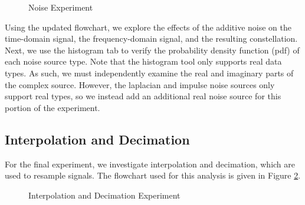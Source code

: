 \documentclass{article}
\begin{document}
\begin{figure}[H]
	\centerline{}
	\caption{Noise Experiment}
	\label{fig::noise_experiment}
\end{figure}

Using the updated flowchart, we explore the effects of the additive noise on the time-domain signal, the frequency-domain signal, and the resulting constellation. Next, we use the histogram tab to verify the probability density function (pdf) of each noise source type. Note that the histogram tool only supports real data types. As such, we must independently examine the real and imaginary parts of the complex source. However, the laplacian and impulse noise sources only support real types, so we instead add an additional real noise source for this portion of the experiment. 


\subsection{Interpolation and Decimation}

For the final experiment, we investigate interpolation and decimation, which are used to resample signals. The flowchart used for this analysis is given in Figure \ref{fig::interpolation_and_decimation_experiment}.

\begin{figure}[H]
	\centerline{}
	\caption{Interpolation and Decimation Experiment}
	\label{fig::interpolation_and_decimation_experiment}
\end{figure}
\end{document}
